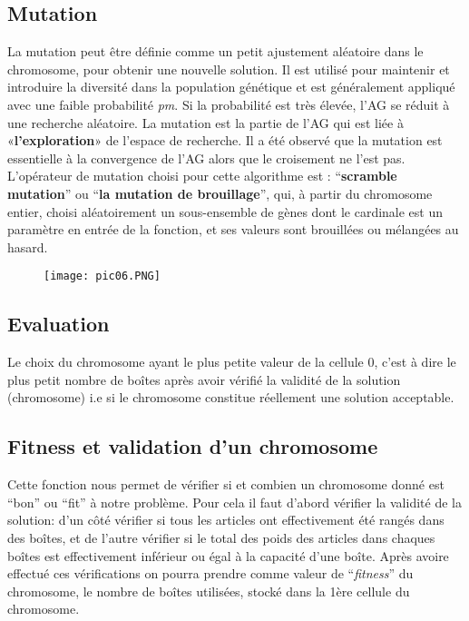 \documentclass{report}
\begin{document}
\subsection{Mutation}
La mutation peut être définie comme un petit ajustement aléatoire dans le chromosome, pour obtenir une nouvelle solution. Il est utilisé pour maintenir et introduire la diversité dans la population génétique et est généralement appliqué avec une faible probabilité \textit{pm}. Si la probabilité est très élevée, l'AG se réduit à une recherche aléatoire.
\newline
La mutation est la partie de l'AG qui est liée à «\textbf{l'exploration}» de l'espace de recherche. Il a été observé que la mutation est essentielle à la convergence de l'AG alors que le croisement ne l'est pas.
\newline
L’opérateur de mutation choisi pour cette algorithme est :  “\textbf{scramble mutation}” ou “\textbf{la mutation de brouillage}”, qui, à partir du chromosome entier, choisi aléatoirement un sous-ensemble de gènes dont le cardinale est un paramètre en entrée de la fonction, et ses valeurs sont brouillées ou mélangées au hasard.
\begin{figure}[H]
  \texttt{[image: pic06.PNG]}
\end{figure}
\subsection{Evaluation}
Le choix du chromosome ayant le plus petite valeur de la cellule 0, c’est à dire le plus petit nombre de  boîtes après avoir vérifié la validité de la solution (chromosome) i.e si le chromosome constitue réellement une solution acceptable.
\subsection{Fitness et validation d’un chromosome}
Cette fonction nous permet de vérifier si et combien un chromosome donné est “bon” ou “fit” à notre problème. 
\newline
Pour cela il faut d’abord vérifier la validité de la solution: d’un côté vérifier si tous les articles ont effectivement été rangés dans des boîtes, et de l’autre vérifier si le total des poids des articles dans chaques boîtes est effectivement inférieur ou égal à la capacité d’une boîte. 
\newline
Après avoire effectué ces vérifications on pourra prendre comme valeur de “\textit{fitness}” du chromosome, le nombre de boîtes utilisées, stocké dans la 1ère cellule du chromosome.
\end{document}
